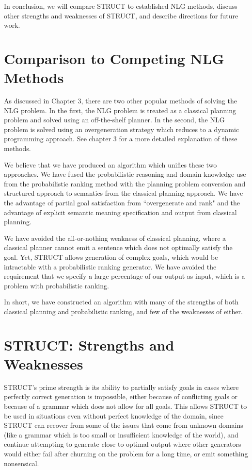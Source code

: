 In conclusion, we will compare STRUCT to established NLG methods,
discuss other strengths and weaknesses of STRUCT, and describe
directions for future work.

\section{Comparison to Competing NLG Methods}

As discussed in Chapter 3, there are two other popular methods of
solving the NLG problem.  In the first, the NLG problem is treated as a
classical planning problem and solved using an off-the-shelf planner.
In the second, the NLG problem is solved using an overgeneration
strategy which reduces to a dynamic programming approach.  See
chapter 3 for a more detailed explanation of these methods.

We believe that we have produced an algorithm which unifies these
two approaches.  We have fused the probabilistic reasoning and
domain knowledge use from the probabilistic ranking method with
the planning problem conversion and structured approach to semantics
from the classical planning approach.  We have the advantage of
partial goal satisfaction from ``overgenerate and rank" and the
advantage of explicit semantic meaning specification and
output from classical planning.

We have avoided the all-or-nothing weakness of classical planning,
where a classical planner cannot emit a sentence which does not
optimally satisfy the goal.  Yet, STRUCT allows generation of complex
goals, which would be intractable with a probabilistic ranking generator.
We have avoided the requirement that we specify a large percentage of
our output as input, which is a problem with probabilistic ranking.

In short, we have constructed an algorithm with many of the strengths
of both classical planning and probabilistic ranking, and few of the
weaknesses of either.

\section{STRUCT: Strengths and Weaknesses}

STRUCT's prime strength is its ability to partially satisfy goals in cases where
perfectly correct generation is impossible, either because of conflicting
goals or because of a grammar which does not allow for all goals.
This allows STRUCT to be used in situations even without perfect knowledge
of the domain, since STRUCT can recover from some of the issues that come
from unknown domains (like a grammar which is too small or insufficient knowledge
of the world), and continue attempting to generate close-to-optimal output
where other generators would either fail after churning on the problem
for a long time, or emit something nonsensical.

